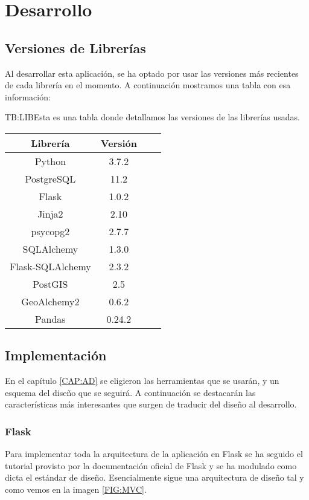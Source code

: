 
\chapter{Desarrollo\label{CAP:DESARROLLO}}
  \section{Versiones de Librerías}
    Al desarrollar esta aplicación, se ha optado por usar las versiones más recientes de cada librería en el momento. A continuación mostramos una tabla con esa información:

    \begin{table}[Tabla de versiones de librerías]{TB:LIB}{Esta es una tabla donde detallamos las versiones de las librerías usadas.}
      \begin{tabular}{cccc}
        \hline
        \textbf{Librería} & \textbf{Versión} \\
        \hline \hline
        Python & 3.7.2 \\
        PostgreSQL & 11.2 \\
        Flask & 1.0.2 \\
        Jinja2 & 2.10 \\
        psycopg2 & 2.7.7 \\  
        SQLAlchemy & 1.3.0 \\ 
        Flask-SQLAlchemy & 2.3.2 \\
        PostGIS & 2.5 \\
        GeoAlchemy2 & 0.6.2 \\
        Pandas & 0.24.2 \\
        \hline
      \end{tabular}
    \end{table}
  
  
  \section{Implementación}
    En el capítulo \ref{CAP:AD} se eligieron las herramientas que se usarán, y un esquema del diseño que se seguirá. A continuación se destacarán las características más interesantes que surgen de traducir del diseño al desarrollo.
    
    \subsection{Flask}
      Para implementar toda la arquitectura de la aplicación en Flask se ha seguido el tutorial provisto por la documentación oficial de Flask \cite{flask} y se ha modulado como dicta el estándar de diseño.
      Esencialmente sigue una arquitectura de diseño  tal y como vemos en la imagen \ref{FIG:MVC}. 
      
